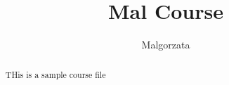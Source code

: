 \documentclass{xourse}
\author{Malgorzata}
\title{Mal Course}%
\begin{document}
      
\begin{abstract} %
THis is a sample course file
\end{abstract}
\maketitle
      

      
\end{document}
